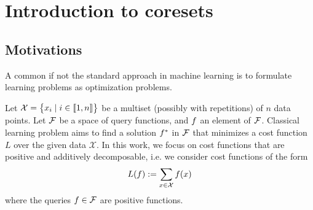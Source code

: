 
\chapter{Introduction to coresets}

\section{Motivations}




A common if not the standard approach in machine learning
is to formulate learning problems as optimization problems.

Let $\mathcal{X}=\begin{Bmatrix}
x_{i} \mid i\in \llbracket 1,n \rrbracket
\end{Bmatrix}$ be a multiset (possibly with repetitions) of $n$ data points. Let $\mathcal{F}$ be a space of query functions, and $f$ an element of $\mathcal{F}$. Classical learning problem aims to find a solution $f ^*$ in $\mathcal{F}$ that minimizes a cost function $L$ over the given data $\mathcal{X}$. In this work, we focus on cost functions that are positive and additively decomposable, i.e. we consider cost functions of the form
\begin{equation*}
L(f ):=\sum_{x \in \mathcal{X}} f (x)
\end{equation*}
where the queries $f \in \mathcal{F}$ are positive functions.

